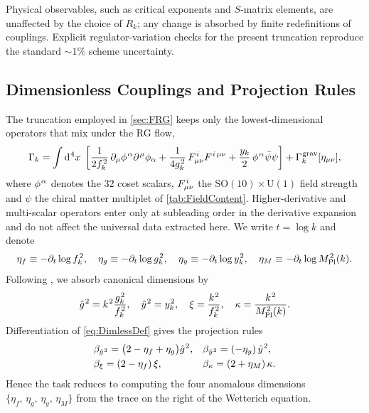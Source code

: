 \documentclass[pdflatex,sn-mathphys-num]{sn-jnl}
\theoremstyle{thmstyleone}
\theoremstyle{thmstyletwo}%
\theoremstyle{thmstylethree}%
\newcommand{\SO}[1]{\mathrm{SO(#1)}}
\newcommand{\U}[1]{\mathrm{U(#1)}}
\newcommand{\SOTen}{\SO{10}}
\newcommand{\UOne}{\U{1}}
\newcommand{\SOTenXUOne}{\SOTen \times \UOne}
\newcommand{\sm}{\hspace{.065em}}
\newcommand{\smexp}[1]{^{\sm #1}}
\newcommand{\dv}[1]{\mathrm{d}\smexp{#1}}
\begin{document}
\begin{appendices}
Physical observables, such as critical exponents and $S$-matrix elements, are unaffected by the choice of $R_{k}$; any change is absorbed by finite redefinitions of couplings.  Explicit regulator-variation checks for the present truncation reproduce the standard $\sim1\%$ scheme uncertainty.

\subsection{Dimensionless Couplings and Projection Rules}
\label{app:FRG:Dimless}

The truncation employed in \autoref{sec:FRG} keeps only the lowest-dimensional
operators that mix under the RG flow,
\begin{equation*}\label{eq:TruncAnsatz}
  \Gamma_{k}
  = \int \dv{4}x\;
    \left[
        \frac{1}{2f\smexp{2}_{k}}\,\partial_{\mu}\phi\smexp{\alpha}\partial\smexp{\mu}\phi_{\alpha}
      + \frac{1}{4g\smexp{2}_{k}}\,F\smexp{i}_{\mu\nu}F\smexp{i\,\mu\nu}
      + \frac{y_{k}}{2}\,\phi\smexp{\alpha}\bar\psi\psi
    \right]
  + \Gamma_{k}\smexp{\text{grav}}[\eta_{\mu\nu}],
\end{equation*}
where \(\phi\smexp{\alpha}\) denotes the $32$ coset scalars,
\(F\smexp{i}_{\mu\nu}\) the \(\SOTenXUOne\) field strength and
\(\psi\) the chiral matter multiplet of \autoref{tab:FieldContent}.
Higher-derivative and multi-scalar operators enter only at subleading
order in the derivative expansion and do not affect the universal data
extracted here.
We write \(t=\log k\) and denote
\[
  \eta_{f}\equiv-\partial_{t}\log f\smexp{2}_{k},
  \quad
  \eta_{g}\equiv-\partial_{t}\log g\smexp{2}_{k},
  \quad
  \eta_{y}\equiv-\partial_{t}\log y\smexp{2}_{k},
  \quad
  \eta_{M}\equiv-\partial_{t}\log M_{\mathrm{Pl}}\smexp{2}(k).
\]
Following \cite{PercacciReview}, we absorb canonical dimensions by
\begin{equation}\label{eq:DimlessDef}
  \hat g\smexp{2}=k\smexp{2}\frac{g\smexp{2}_{k}}{f\smexp{2}_{k}},\quad
  \hat y\smexp{2}=y\smexp{2}_{k},\quad
  \xi=\frac{k\smexp{2}}{f\smexp{2}_{k}},\quad
  \kappa=\frac{k\smexp{2}}{M_{\mathrm{Pl}}\smexp{2}(k)}.
\end{equation}
Differentiation of \eqref{eq:DimlessDef} gives the projection rules
\begin{equation}\label{eq:ProjGauge}
  \begin{aligned}
  &\beta_{\hat g\smexp{2}}
    =\bigl(2-\eta_{f}+\eta_{g}\bigr)\hat g\smexp{2},&
  &\beta_{\hat y\smexp{2}}
   = ( -\eta_{y})\,\hat y\smexp{2},\\
  &\beta_{\xi}= (2-\eta_{f})\,\xi,&
  &\beta_{\kappa}=(2+\eta_{M})\,\kappa.
  \end{aligned}
\end{equation}
Hence the task reduces to computing the four anomalous
dimensions \(\{\eta_{f},\,\eta_{g},\,\eta_{y},\,\eta_{M}\}\) from the trace on
the right of the Wetterich equation.



\end{appendices}
\end{document}
